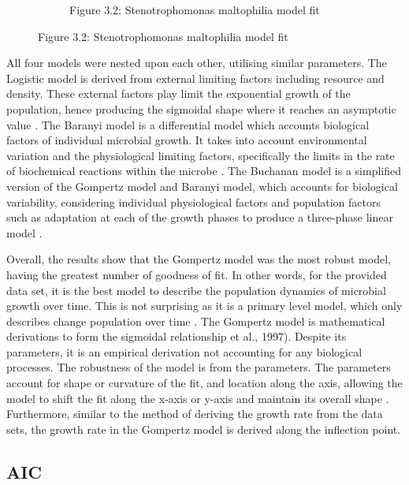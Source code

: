 \documentclass[11pt]{article}
\begin{document}
\begin{figure}[h!]
\begin{subfigure}[h]{0.4\textwidth}
        \caption{Figure 3.2: Stenotrophomonas maltophilia model fit}
        \label{fig:Stenotrophomonas maltophilia}
    \end{subfigure}
\end{figure}

All four models were nested upon each other, utilising similar parameters. The Logistic model is derived from external limiting factors including resource and density. These external factors play limit the exponential growth of the population, hence producing the sigmoidal shape where it reaches an asymptotic value \cite{webb1986logistic}. The Baranyi model is a differential model which accounts biological factors of individual microbial growth. It takes into account environmental variation and the physiological limiting factors, specifically the limits in the rate of biochemical reactions within the microbe \cite{buchanan1997simple, grijspeerdt1999estimating}. The Buchanan model is a simplified version of the Gompertz model and Baranyi model, which accounts for biological variability, considering individual physiological factors and population factors such as adaptation at each of the growth phases to produce a three-phase linear model \cite{buchanan1997simple}.

Overall, the results show that the Gompertz model was the most robust model, having the greatest number of goodness of fit. In other words, for the provided data set, it is the best model to describe the population dynamics of microbial growth over time. This is not surprising as it is a primary level model, which only describes change population over time \cite{grijspeerdt1999estimating}. The Gompertz model is mathematical derivations to form the sigmoidal relationship \cite{buchanan1997simple} et al., 1997). Despite its parameters, it is an empirical derivation not accounting for any biological processes. The robustness of the model is from the parameters. The parameters account for shape or curvature of the fit, and location along the axis, allowing the model to shift the fit along the x-axis or y-axis and maintain its overall shape \cite{tjorve2017use}. Furthermore, similar to the method of deriving the growth rate from the data sets, the growth rate in the Gompertz model is derived along the inflection point.

\subsection{AIC}
\end{document}
